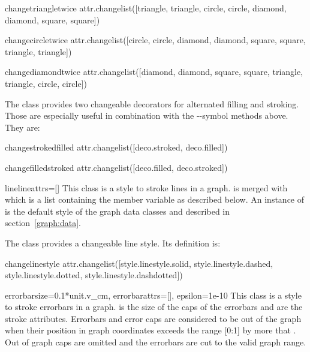 \begin{memberdesc}{changetriangletwice}
  attr.changelist([triangle, triangle, circle, circle, diamond, diamond, square, square])
\end{memberdesc}

\begin{memberdesc}{changecircletwice}
  attr.changelist([circle, circle, diamond, diamond, square, square, triangle, triangle])
\end{memberdesc}

\begin{memberdesc}{changediamondtwice}
  attr.changelist([diamond, diamond, square, square, triangle, triangle, circle, circle])
\end{memberdesc}

The class  provides two changeable decorators for
alternated filling and stroking. Those are especially useful in
combination with the --symbol methods
above. They are:

\begin{memberdesc}{changestrokedfilled}
  attr.changelist([deco.stroked, deco.filled])
\end{memberdesc}

\begin{memberdesc}{changefilledstroked}
  attr.changelist([deco.filled, deco.stroked])
\end{memberdesc} %

\begin{classdesc}{line}{lineattrs=[]} %
  This class is a style to stroke lines in a graph.
   is merged with  which is
  a list containing the member variable  as
  described below. An instance of  is the default style
  of the graph data classes  and 
  described in section~\ref{graph:data}.
\end{classdesc}

The class  provides a changeable line style. Its
definition is:

\begin{memberdesc}{changelinestyle}
  attr.changelist([style.linestyle.solid, style.linestyle.dashed, style.linestyle.dotted, style.linestyle.dashdotted])
\end{memberdesc} %

\begin{classdesc}{errorbar}{size=0.1*unit.v\_cm, errorbarattrs=[], %
                            epsilon=1e-10}
  This class is a style to stroke errorbars in a graph.  is
  the size of the caps of the errorbars and  are
  the stroke attributes. Errorbars and error caps are considered to be
  out of the graph when their position in graph coordinates exceeds
  the range [0:1] by more that . Out of graph caps are
  omitted and the errorbars are cut to the valid graph range.
\end{classdesc} %

